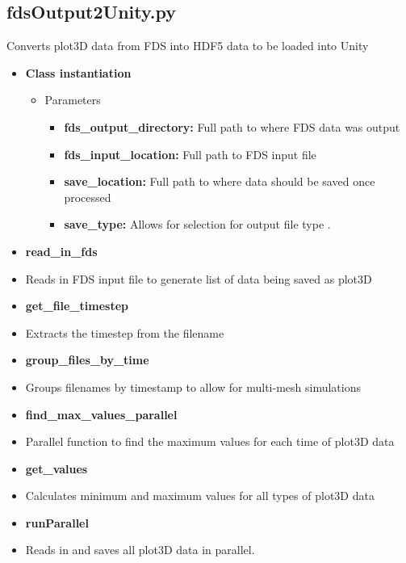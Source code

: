 \subsection{fdsOutput2Unity.py}
\label{PythonOutput2Unity}
Converts plot3D data from FDS into HDF5 data to be loaded into Unity
\begin{itemize}
    \item \textbf{Class instantiation}
    \begin{itemize}    
    \item Parameters   
        \begin{itemize}
        \item\textbf{fds\_output\_directory:}  Full path to where FDS data was output
        \item\textbf{fds\_input\_location:}  Full path to FDS input file
        \item\textbf{save\_location:} Full path to where data should be saved once processed
        \item\textbf{save\_type:} Allows for selection for output file type
.
        \end{itemize} 
    \end{itemize}
    
    \item \textbf{read\_in\_fds}
    \item[] Reads in FDS input file to generate list of data being saved as plot3D 
    
    \item \textbf{get\_file\_timestep}
    \item[] Extracts the timestep from the filename
      
    \item \textbf{group\_files\_by\_time}
    \item[]  Groups filenames by timestamp to allow for multi-mesh simulations
    
    \item \textbf{find\_max\_values\_parallel}
    \item[] Parallel function to find the maximum values for each time of plot3D data

    \item \textbf{get\_values}
    \item[] Calculates minimum and maximum values for all types of plot3D data


    \item \textbf{runParallel}
    \item[] Reads in and saves all plot3D data in parallel.


\end{itemize}
